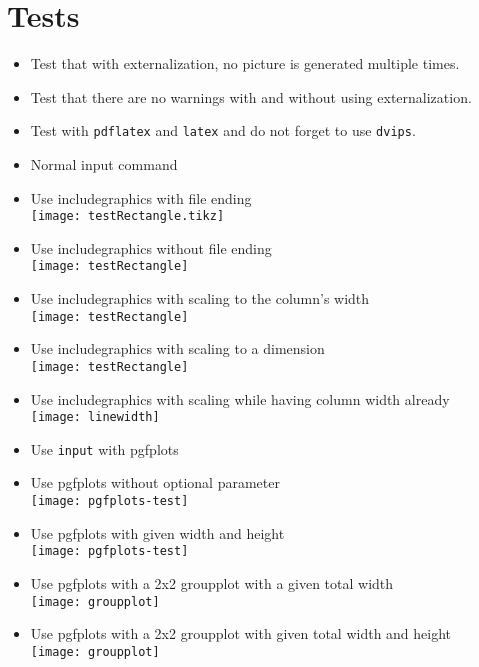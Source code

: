 \documentclass[twocolumn]{article}
\begin{document}
	\section*{Tests}
	\begin{itemize}
		\item Test that with externalization, no picture is generated multiple times.
		\item Test that there are no warnings with and without using externalization.
		\item Test with \texttt{pdflatex} and \texttt{latex} and do not forget to use \texttt{dvips}.
		\item Normal input command\\%
		\item Use includegraphics with file ending\\%
			\texttt{[image: testRectangle.tikz]}%
		\item Use includegraphics without file ending\\%
			\texttt{[image: testRectangle]}%
		\item Use includegraphics with scaling to the column's width\\%
			\texttt{[image: testRectangle]}%
		\item Use includegraphics with scaling to a dimension\\%
			\texttt{[image: testRectangle]}%
		\item Use includegraphics with scaling while having column width already\\%
			\texttt{[image: linewidth]}%
		\item Use \texttt{input} with pgfplots\\%
		\item Use pgfplots without optional parameter\\%
			\texttt{[image: pgfplots-test]}%
		\item Use pgfplots with given width and height\\%
			\texttt{[image: pgfplots-test]}%
		\item Use pgfplots with a 2x2 groupplot with a given total width\\%
			\texttt{[image: groupplot]}
		\item Use pgfplots with a 2x2 groupplot with given total width and height\\%
			\texttt{[image: groupplot]}

\end{itemize}
\end{document}
